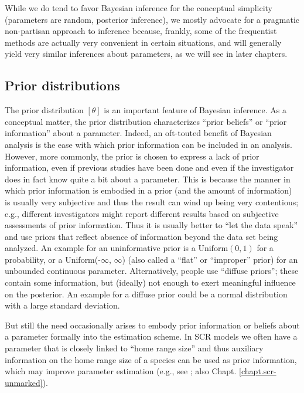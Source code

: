 While we do tend to favor Bayesian inference for the conceptual
simplicity (parameters are random, posterior inference), we mostly
advocate for a pragmatic non-partisan approach to inference because,
frankly, some of the frequentist methods are actually very
convenient in certain situations, and will generally yield very
similar inferences about parameters, as we will see in later chapters.


\subsection{Prior distributions}

The prior distribution $[\theta]$ is an important feature of Bayesian
inference. As a conceptual matter,
the prior distribution characterizes ``prior beliefs'' or ``prior
information'' about a parameter. Indeed,
an oft-touted benefit of Bayesian analysis is the ease with which
prior information can be included in an analysis. 
However, more commonly, the prior is chosen to
express a lack of prior information, even if previous studies have
been done and even if the investigator does in fact know quite a bit
about a parameter.
This is because
the manner in which prior information is embodied in a prior (and the
amount of information) is
usually very subjective and thus the result can wind up being very
contentious; e.g., different investigators might report different
results based on subjective assessments of prior information. Thus it is usually
better to ``let the data speak'' and use priors that reflect absence
of information beyond the data set being analyzed. An example for an
uninformative prior is a $\mbox{Uniform}(0,1)$ for a probability, or a
\mbox{Uniform}(-$\infty$, $\infty$) (also called a ``flat'' or
``improper'' prior) for an unbounded continuous
parameter. Alternatively, people use ``diffuse priors''; these contain
some information, but (ideally) not enough to exert meaningful
influence on the posterior. An example for a diffuse prior could be a normal distribution with a large standard deviation.

But still the need occasionally arises to embody prior information or
beliefs about a parameter formally into the estimation scheme.
 In SCR models we often have a parameter that is closely linked
to ``home range size'' and thus auxiliary information on the home
range size of a species can be used as prior information, which may improve parameter estimation (e.g., see
\citet{chandler_royle:2012}; also Chapt. \ref{chapt.scr-unmarked}).

